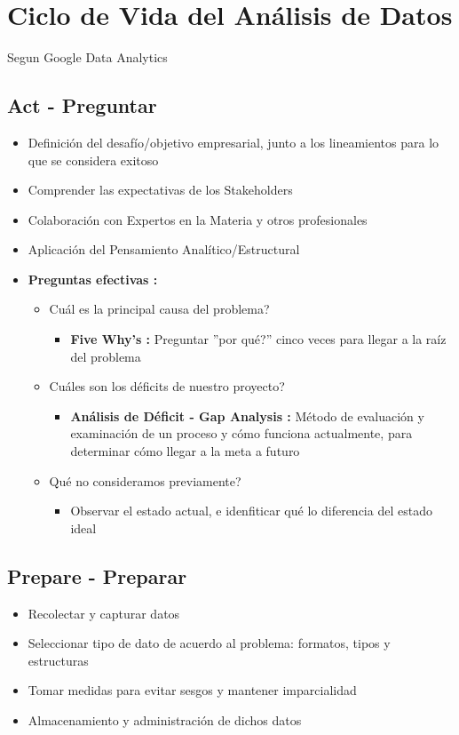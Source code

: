 \section{Ciclo de Vida del Análisis de Datos}
Segun Google Data Analytics

\subsection{Act - Preguntar}
\begin{itemize}
    \item {Definición del desafío/objetivo empresarial, junto a los lineamientos para lo que se considera exitoso}
    \item {Comprender las expectativas de los Stakeholders}
    \item {Colaboración con Expertos en la Materia y otros profesionales}
    \item {Aplicación del Pensamiento Analítico/Estructural}
    \item {\textbf{Preguntas efectivas : }
    \begin{itemize}
        \item {Cuál es la principal causa del problema?}
        \begin{itemize}
            \item {\textbf{Five Why's : }Preguntar ''por qué?'' cinco veces para llegar a la raíz del problema}
        \end{itemize}
        \item {Cuáles son los déficits de nuestro proyecto?}
        \begin{itemize}
            \item {\textbf{Análisis de Déficit - Gap Analysis : }Método de evaluación y examinación de un proceso y cómo funciona actualmente, para determinar cómo llegar a la meta a futuro}
        \end{itemize}
        \item {Qué no consideramos previamente?}
        \begin{itemize}
            \item {Observar el estado actual, e idenfiticar qué lo diferencia del estado ideal}
        \end{itemize}
    \end{itemize}}
\end{itemize}

\subsection{Prepare - Preparar}
\begin{itemize}
    \item {Recolectar y capturar datos}
    \item {Seleccionar tipo de dato de acuerdo al problema: formatos, tipos y estructuras}
    \item {Tomar medidas para evitar sesgos y mantener imparcialidad}
    \item {Almacenamiento y administración de dichos datos}
\end{itemize}

